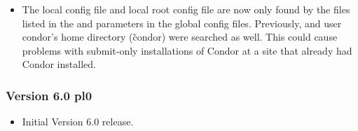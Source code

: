 \begin{itemize}
\item The local config file and local root config file are now only
found by the files listed in the  and
 parameters in the global config
files.
Previously,  and user condor's home directory
(\~condor) were searched as well.
This could cause problems with submit-only installations of Condor at
a site that already had Condor installed.

\end{itemize}

\subsubsection{\label{sec:New-6-0-pl0}Version 6.0 pl0}

\begin{itemize}

\item Initial Version 6.0 release.

\end{itemize}
